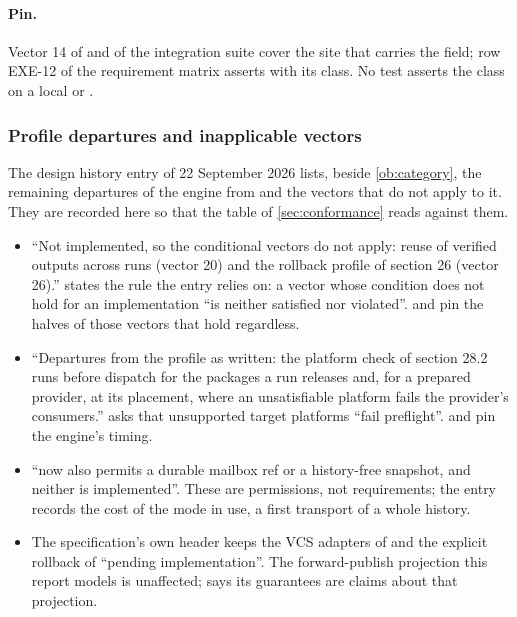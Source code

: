\paragraph{Pin.} Vector 14 of  and
 of the integration suite cover
the site that carries the field; row EXE-12 of the requirement matrix
asserts  with its  class. No test
asserts the class on a local  or .

\subsubsection{Profile departures and inapplicable vectors}

\begin{obligation}
\label{ob:profile}
The design history entry of 22 September 2026 lists, beside
\cref{ob:category}, the remaining departures of the engine from 
and the vectors that do not apply to it. They are recorded here so that the
table of \cref{sec:conformance} reads against them.
\end{obligation}

\begin{itemize}
  \item ``Not implemented, so the conditional vectors do not apply: reuse of
    verified outputs across runs (vector 20) and the rollback profile of
    section 26 (vector 26).''  states the rule the entry relies
    on: a vector whose condition does not hold for an implementation ``is
    neither satisfied nor violated''.
     and
     pin the halves of those
    vectors that hold regardless.
  \item ``Departures from the profile as written: the platform check of
    section 28.2 runs before dispatch for the packages a run releases and,
    for a prepared provider, at its placement, where an unsatisfiable
    platform fails the provider's consumers.''  asks that
    unsupported target platforms ``fail preflight''.
     and
    pin the engine's timing.
  \item {} ``now also permits a durable mailbox ref or a
    history-free snapshot, and neither is implemented''. These are
    permissions, not requirements; the entry records the cost of the mode in
    use, a first transport of a whole history.
  \item The specification's own header keeps the VCS adapters of 
    and the explicit rollback of  ``pending implementation''. The
    forward-publish projection this report models is unaffected;
     says its guarantees are claims about that projection.
\end{itemize}

